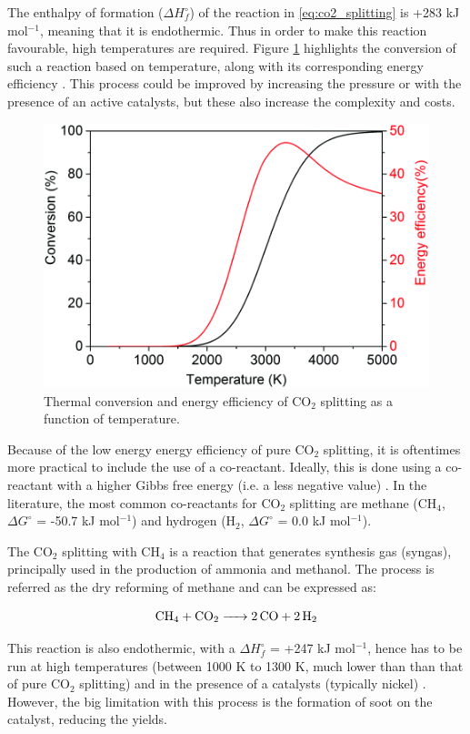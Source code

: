 The enthalpy of formation ($\Delta H^\circ_f$) of the reaction in \ref{eq:co2_splitting} is +283 kJ mol$^{-1}$, meaning that it is endothermic. Thus in order to make this reaction favourable, high temperatures are required. Figure \ref{fig:thermal_co2_conversion} highlights the conversion of such a reaction based on temperature, along with its corresponding energy efficiency \cite{Snoeckx2017}. This process could be improved by increasing the pressure or with the presence of an active catalysts, but these also increase the complexity and costs.

\begin{figure}[h!]
	\centering
	\includegraphics[width=0.6\linewidth]{chapter_3/figures/thermal_co2_conversion.png}
	\caption{Thermal conversion and energy efficiency of CO$_2$ splitting as a function of temperature. \cite{Snoeckx2017}}
	\label{fig:thermal_co2_conversion}
\end{figure}

Because of the low energy energy efficiency of pure CO$_2$ splitting, it is oftentimes more practical to include the use of a co-reactant. Ideally, this is done using a co-reactant with a higher Gibbs free energy (i.e. a less negative value) \cite{jiang_xiao_kuznetsov_edwards_2010}. In the literature, the most common co-reactants for CO$_2$ splitting are methane (CH$_4$, $\Delta G^\circ$ = -50.7 kJ mol$^{-1}$) and hydrogen (H$_2$, $\Delta G^\circ$ = 0.0 kJ mol$^{-1}$).

The CO$_2$ splitting with CH$_4$ is a reaction that generates synthesis gas (syngas), principally used in the production of ammonia and methanol. The process is referred as the dry reforming of methane and can be expressed as: 

\begin{equation}
    \ce{CH_4 + CO_2 -> 2CO + 2H_2}
    \label{eq:drm}
\end{equation}

This reaction is also endothermic, with a $\Delta H^\circ_f$ = +247 kJ mol$^{-1}$, hence has to be run at high temperatures (between 1000 K to 1300 K, much lower than than that of pure CO$_2$ splitting) and in the presence of a catalysts (typically nickel) \cite{pakhare_spivey_2014}. However, the big limitation with this process is the formation of soot on the catalyst, reducing the yields.

